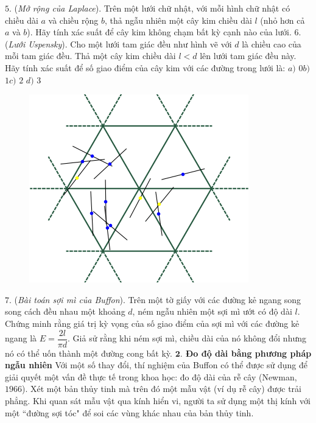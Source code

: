\begin{multicols}{2}
	\vskip 0.1cm
	$5$. (\textit{Mở rộng của Laplace}). Trên một lưới chữ nhật, với mỗi hình chữ nhật có chiều dài $a$ và chiều rộng $b$, thả ngẫu nhiên một cây kim chiều dài $l$ (nhỏ hơn cả $a$ và $b$). Hãy tính xác suất để cây kim không chạm bất kỳ cạnh nào của lưới.
	\vskip 0.1cm
	$6$. (\textit{Lưới Uspensky}). Cho một lưới tam giác đều như hình vẽ với $d$ là chiều cao của mỗi tam giác đều. Thả một cây kim chiều dài \linebreak$l<d$ lên lưới tam giác đều này. Hãy tính xác suất để số giao điểm của cây kim với các đường trong lưới là:
	\vskip 0.1cm
	\quad\quad$a)$ $0$\quad\quad		$b)$ $1$\quad\quad		$c)$ $2$	\quad\quad	$d)$ $3$
	\begin{figure}[H]
		\vspace*{5pt}
		\centering
		\captionsetup{labelformat= empty, justification=centering}
		\includegraphics[width=1\linewidth]{6}
		\vspace*{-15pt}
	\end{figure}
	$7$. (\textit{Bài toán sợi mì của Buffon}). Trên một tờ giấy với các đường kẻ ngang song song  cách đều nhau một khoảng   $d$, ném ngẫu nhiên một sợi mì ướt có độ dài $l$. Chứng minh rằng giá trị kỳ vọng của số giao điểm của sợi mì với các đường kẻ ngang là $E=\dfrac{2l}{\pi d}$. Giả sử rằng khi ném sợi mì, chiều dài của nó không đổi nhưng nó có thể uốn thành một đường cong bất kỳ.
	\vskip 0.1cm
	\textbf{\color{toanhocdoisong}$\pmb{2.}$ Đo độ dài bằng phương pháp ngẫu nhiên}
	\vskip 0.1cm
	Với một số thay đổi, thí nghiệm của Buffon có thể được sử dụng để giải quyết một vấn đề thực tế trong khoa học: đo độ dài của rễ cây (Newman, $1966$). Xét một bản thủy tinh mà trên đó một mẫu vật (ví dụ rễ cây) được trải phẳng. Khi quan sát mẫu vật qua kính hiển vi, người ta sử dụng một thị kính với một ``đường sợi tóc" để soi các vùng khác nhau của bản thủy tinh.

\end{multicols}
